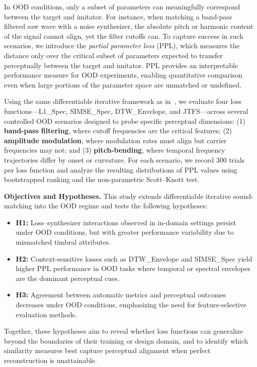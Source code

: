 \documentclass[runningheads,20pt]{llncs}
\begin{document}
In OOD conditions, only a subset of parameters can meaningfully correspond between the target and imitator.  
For instance, when matching a band-pass filtered saw wave with a noise synthesizer, the absolute pitch or harmonic content of the signal cannot align, yet the filter cutoffs can.  
To capture success in such scenarios, we introduce the \emph{partial parameter loss} (PPL), which measures the distance only over the critical subset of parameters expected to transfer perceptually between the target and imitator.  
PPL provides an interpretable performance measure for OOD experiments, enabling quantitative comparison even when large portions of the parameter space are unmatched or undefined.

Using the same differentiable iterative framework as in~\cite{salimi2025soundmatching}, we evaluate four loss functions—L1\_Spec, SIMSE\_Spec, DTW\_Envelope, and JTFS—across several controlled OOD scenarios designed to probe specific perceptual dimensions: (1) \textbf{band-pass filtering}, where cutoff frequencies are the critical features; (2) \textbf{amplitude modulation}, where modulation rates must align but carrier frequencies may not; and (3) \textbf{pitch-bending}, where temporal frequency trajectories differ by onset or curvature.  
For each scenario, we record 300 trials per loss function and analyze the resulting distributions of PPL values using bootstrapped ranking and the non-parametric Scott–Knott test.

\textbf{Objectives and Hypotheses.}  
This study extends differentiable iterative sound-matching into the OOD regime and tests the following hypotheses:
\begin{itemize}
  \item \textbf{H1:} Loss–synthesizer interactions observed in in-domain settings persist under OOD conditions, but with greater performance variability due to mismatched timbral attributes.
  \item \textbf{H2:} Context-sensitive losses such as DTW\_Envelope and SIMSE\_Spec yield higher PPL performance in OOD tasks where temporal or spectral envelopes are the dominant perceptual cues.
  \item \textbf{H3:} Agreement between automatic metrics and perceptual outcomes decreases under OOD conditions, emphasizing the need for feature-selective evaluation methods.
\end{itemize}
Together, these hypotheses aim to reveal whether loss functions can generalize beyond the boundaries of their training or design domain, and to identify which similarity measures best capture perceptual alignment when perfect reconstruction is unattainable.
\end{document}

